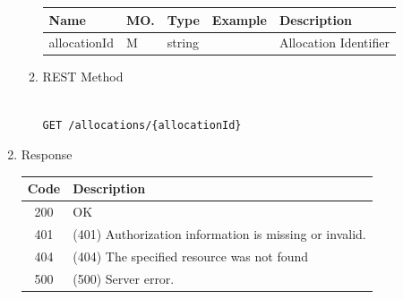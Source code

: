 \begin{enumerate}
\begin{enumerate}
\begin{table}[H]
\footnotesize

\begin{center}
\begin{tabular}{|p{3cm}|l|p{3cm}|p{3cm}|p{4cm}|} 
\hline
\rowcolor{lightgray}	Name	& MO.	& Type	& Example & 	Description \\
\hline

allocationId				& M	& 	string				&								&	Allocation Identifier \\ 
\hline


\end{tabular}
\end{center}
\end{table}


\item REST Method

\begin{tcolorbox}[boxrule=0pt, frame empty]
\begin{verbatim} 

GET /allocations/{allocationId}

\end{verbatim}
\end{tcolorbox}

\end{enumerate}

\item Response

\begin{table}[H]
\footnotesize

\begin{center}
\begin{tabular}{|c|l|} 
\hline
\rowcolor{lightgray}	Code 		& 	Description \\
\hline
200	 		&	OK \\
\hline
401			&	(401) Authorization information is missing or invalid. \\
\hline
404			&	(404) The specified resource was not found \\
\hline
500			&	(500) Server error. \\
\hline
\end{tabular}
\end{center}

\end{table}


\end{enumerate}
